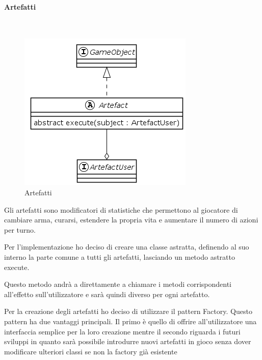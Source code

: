 \documentclass[a4paper,titlepage,12pt]{article}
\begin{document}
\newpage
\paragraph{Artefatti}
\par \noindent \\
\begin{figure}[H]
    \centering
    \includegraphics[scale=0.8]{img/uml/Artefact.png}
    \caption{Artefatti}
    \label{fig: Artefatti}
\end{figure}
\par \noindent Gli artefatti sono modificatori di statistiche che permettono al giocatore di cambiare arma, curarsi, estendere la propria vita e aumentare il numero di azioni per turno.
\par \noindent Per l’implementazione ho deciso di creare una classe astratta, definendo al suo interno la parte comune a tutti gli artefatti,  lasciando un metodo astratto execute. 
\par \noindent Questo metodo andrà a direttamente a chiamare i metodi corrispondenti all’effetto sull’utilizzatore e sarà quindi diverso per ogni artefatto.
\par \noindent Per la creazione degli artefatti ho deciso di utilizzare il pattern Factory. Questo pattern ha due vantaggi principali. Il primo è quello di offrire all’utilizzatore una interfaccia semplice per la loro creazione mentre il secondo riguarda i futuri sviluppi in quanto sarà possibile introdurre nuovi artefatti in gioco senza dover modificare ulteriori classi se non la factory già esistente 
\newpage
\end{document}
